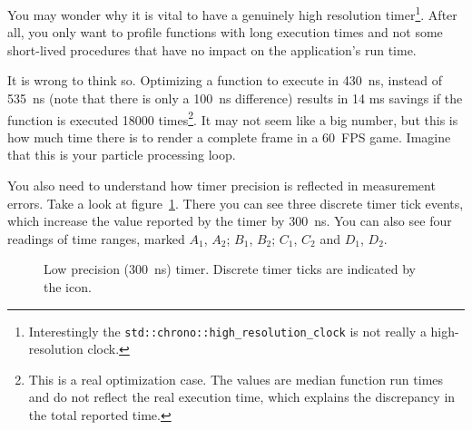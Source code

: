 \documentclass[hidelinks,titlepage,a4paper,twoside]{article}
\begin{document}
You may wonder why it is vital to have a genuinely high resolution timer\footnote{Interestingly the \texttt{std::chrono::high\_resolution\_clock} is not really a high-resolution clock.}. After all, you only want to profile functions with long execution times and not some short-lived procedures that have no impact on the application's run time.

It is wrong to think so. Optimizing a function to execute in 430~\si{\nano\second}, instead of 535~\si{\nano\second} (note that there is only a 100~\si{\nano\second} difference) results in 14 \si{\milli\second} savings if the function is executed 18000 times\footnote{This is a real optimization case. The values are median function run times and do not reflect the real execution time, which explains the discrepancy in the total reported time.}. It may not seem like a big number, but this is how much time there is to render a complete frame in a 60~FPS game. Imagine that this is your particle processing loop.

You also need to understand how timer precision is reflected in measurement errors. Take a look at figure~\ref{timer}. There you can see three discrete timer tick events, which increase the value reported by the timer by 300~\si{\nano\second}. You can also see four readings of time ranges, marked $A_1$, $A_2$; $B_1$, $B_2$; $C_1$, $C_2$ and $D_1$, $D_2$.

\begin{figure}[h]
\centering{}
\caption{Low precision (300~ns) timer. Discrete timer ticks are indicated by the \faClock{} icon.}
\label{timer}
\end{figure}
\end{document}
